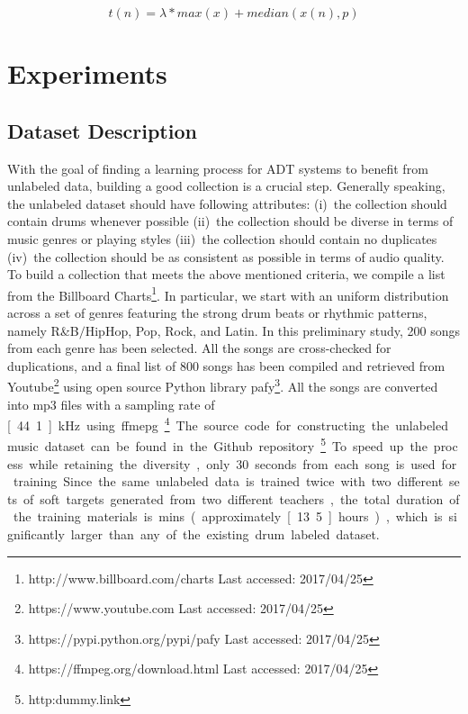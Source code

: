 \documentclass{article}
\begin{document}
\begin{equation}\label{eq:medianThres}
t(n) = \lambda * max(x) + median(x(n), p)
\end{equation} 

\section{Experiments}\label{sec:experiments}

\subsection{Dataset Description}
With the goal of finding a learning process for ADT systems to benefit from unlabeled data, building a good collection is a crucial step. Generally speaking, the unlabeled dataset should have following attributes: (i)~the collection should contain drums whenever possible (ii)~the collection should be diverse in terms of music genres or playing styles (iii)~the collection should contain no duplicates (iv)~the collection should be as consistent as possible in terms of audio quality. To build a collection that meets the above mentioned criteria, we compile a list from the Billboard Charts\footnote{http://www.billboard.com/charts Last accessed: 2017/04/25}. In particular, we start with an uniform distribution across a set of genres featuring the strong drum beats or rhythmic patterns, namely R\&B$\slash$HipHop, Pop, Rock, and Latin. In this preliminary study, 200 songs from each genre has been selected. All the songs are cross-checked for duplications, and a final list of 800 songs has been compiled and retrieved from Youtube\footnote{https://www.youtube.com Last accessed: 2017/04/25} using open source Python library pafy\footnote{https://pypi.python.org/pypi/pafy Last accessed: 2017/04/25}. All the songs are converted into mp3 files with a sampling rate of \unit[44.1]{kHz} using ffmepg\footnote{https://ffmpeg.org/download.html Last accessed: 2017/04/25}. The source code for constructing the unlabeled music dataset can be found in the Github repository\footnote{http:dummy.link}. To speed up the process while retaining the diversity, only 30 seconds from each song is used for training. Since the same unlabeled data is trained twice with two different sets of soft targets generated from two different teachers, the total duration of the training materials is \unit[800]{mins} (approximately \unit[13.5]{hours}), which is significantly larger than any of the existing drum labeled dataset. 
\end{document}
